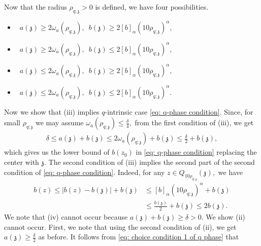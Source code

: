 \documentclass[11pt,oneside, english,reqno,twoside a4paper]{amsart}
\theoremstyle{definition}
\numberwithin{theorem}{section}
\numberwithin{equation}{section}
\newcommand{\mfz}{\mathfrak{z}}
\begin{document}
Now that the radius $\rho_{q; \mfz}>0$ is defined, we have four possibilities.
\begin{itemize}
\item [(i)] $\,\,\,a(\mathfrak{z})\geq 2\omega_a(\rho_{q; \mathfrak{z}}),\,\,\, b(\mathfrak{z})\geq 2[b]_{\alpha}\left(10 \rho_{q; \mathfrak{z}}\right)^{\alpha},$\\
\item [(ii)]  $\,\,\, a(\mathfrak{z})\geq 2\omega_a(\rho_{q; \mathfrak{z}}),\,\,\, b(\mathfrak{z})\leq 2[b]_{\alpha}\left(10 \rho_{q; \mathfrak{z}}\right)^{\alpha},$\\
\item [(iii)]  $ \,\,\, a(\mathfrak{z})\leq 2\omega_a(\rho_{q; \mathfrak{z}}),\,\,\, b(\mathfrak{z})\geq 2[b]_{\alpha}\left(10 \rho_{q; \mathfrak{z}}\right)^{\alpha},$\\
\item [(iv)]  $\,\,\, a(\mathfrak{z})\leq 2\omega_a(\rho_{q; \mathfrak{z}}),\,\,\, b(\mathfrak{z})\leq 2[b]_{\alpha}\left(10 \rho_{q; \mathfrak{z}}\right)^{\alpha}.$\\
\end{itemize}
Now we show that (iii) implies $q$-intrinsic case \eqref{eq: q-phase condition}. Since, for small $\rho_{q; \mathfrak{z}}$ we may assume $\omega_a(\rho_{q; \mathfrak{z}})\leq  \frac{\delta}{4},$ from the first condition of (iii), we get
\begin{align*}
    \delta \leq a(\mathfrak{z})+b(\mathfrak{z})\leq 2\omega_a(\rho_{q; \mathfrak{z}})+b(\mathfrak{z})\leq \frac{\delta}{2}+b(\mathfrak{z}),
\end{align*}
which gives us the lower bound of $b(z_0)$ in \eqref{eq: q-phase condition} replacing the center with $\mathfrak{z}.$ The second condition of (iii) implies the second part of the second condition of \eqref{eq: q-phase condition}. Indeed, for any $z \in Q_{10 \rho_{q; \mathfrak{z}}}(\mathfrak{z}),$ we have
\begin{align*}
b(z)\leq |b(z)-b(\mathfrak{z})|+b(\mathfrak{z})&\leq [b]_{\alpha}(10 \rho_{q; \mathfrak{z}})^{\alpha}+b(\mathfrak{z})\\
&\leq \frac{b(\mathfrak{z})}{2}+b(\mathfrak{z})\leq 2 b(\mathfrak{z}).
\end{align*}
We note that (iv) cannot occur because $a(\mfz)+b(\mfz)\geq \delta>0.$ We show (ii) cannot occur. First, we note that using the second condition of (ii), we get $a(\mathfrak{z})\geq \frac{\delta}{2}$ as before. It follows from \eqref{eq: choice condition 1 of q phase} that
\end{document}

